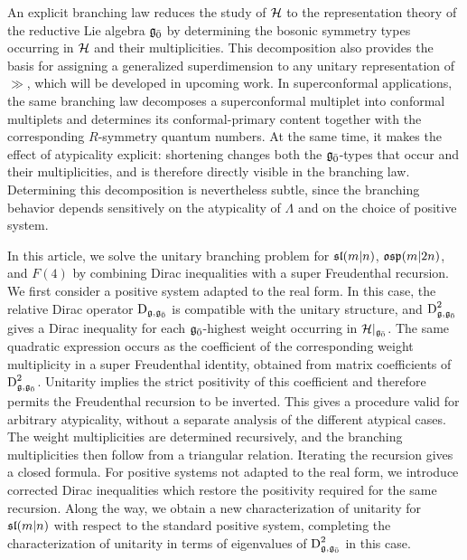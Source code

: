 An explicit branching law reduces the study of $\HH$ to the representation theory of the reductive Lie algebra $\even$ by determining the bosonic symmetry types occurring in $\HH$ and their multiplicities. This decomposition also provides the basis for assigning a generalized superdimension to any unitary representation of $\gg$, which will be developed in upcoming work. In superconformal applications, the same branching law decomposes a superconformal multiplet into conformal multiplets and determines its conformal-primary content together with the corresponding $R$-symmetry quantum numbers. At the same time, it makes the effect of atypicality explicit: shortening changes both the $\even$-types that occur and their multiplicities, and is therefore directly visible in the branching law. Determining this decomposition is nevertheless subtle, since the branching behavior depends sensitively on the atypicality of $\Lambda$ and on the choice of positive system.

In this article, we solve the unitary branching problem for $\sl(m\vert n)$, $\osp(m\vert2n)$, and $F(4)$ by combining Dirac inequalities with a super Freudenthal recursion. We first consider a positive system adapted to the real form. In this case, the relative Dirac operator $\Dirac_{\gg,\even}$ is compatible with the unitary structure, and $\Dirac_{\gg,\even}^{2}$ gives a Dirac inequality for each $\even$-highest weight occurring in $\HH\vert_{\even}$. The same quadratic expression occurs as the coefficient of the corresponding weight multiplicity in a super Freudenthal identity, obtained from matrix coefficients of $\Dirac_{\gg,\even}^{2}$. Unitarity implies the strict positivity of this coefficient and therefore permits the Freudenthal recursion to be inverted. This gives a procedure valid for arbitrary atypicality, without a separate analysis of the different atypical cases. The weight multiplicities are determined recursively, and the branching multiplicities then follow from a triangular relation. Iterating the recursion gives a closed formula. For positive systems not adapted to the real form, we introduce corrected Dirac inequalities which restore the positivity required for the same recursion. Along the way, we obtain a new characterization of unitarity for $\slmn$ with respect to the standard positive system, completing the characterization of unitarity in terms of eigenvalues of $\Dirac_{\gg,\even}^{2}$ in this case.




